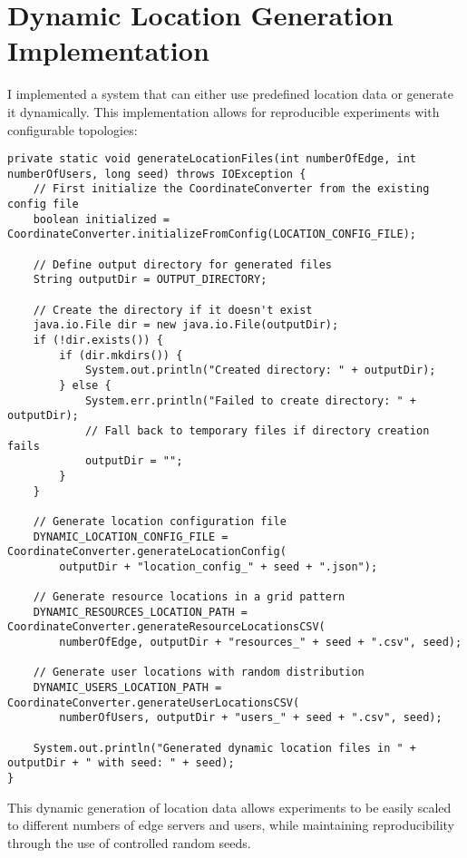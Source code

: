 \chapter{Dynamic Location Generation Implementation}
\label{appendix:location-generation}

I implemented a system that can either use predefined location data or generate it dynamically. This implementation allows for reproducible experiments with configurable topologies:

\begin{verbatim}
private static void generateLocationFiles(int numberOfEdge, int numberOfUsers, long seed) throws IOException {
    // First initialize the CoordinateConverter from the existing config file
    boolean initialized = CoordinateConverter.initializeFromConfig(LOCATION_CONFIG_FILE);
    
    // Define output directory for generated files
    String outputDir = OUTPUT_DIRECTORY;
    
    // Create the directory if it doesn't exist
    java.io.File dir = new java.io.File(outputDir);
    if (!dir.exists()) {
        if (dir.mkdirs()) {
            System.out.println("Created directory: " + outputDir);
        } else {
            System.err.println("Failed to create directory: " + outputDir);
            // Fall back to temporary files if directory creation fails
            outputDir = "";
        }
    }
    
    // Generate location configuration file
    DYNAMIC_LOCATION_CONFIG_FILE = CoordinateConverter.generateLocationConfig(
        outputDir + "location_config_" + seed + ".json");
    
    // Generate resource locations in a grid pattern
    DYNAMIC_RESOURCES_LOCATION_PATH = CoordinateConverter.generateResourceLocationsCSV(
        numberOfEdge, outputDir + "resources_" + seed + ".csv", seed);
    
    // Generate user locations with random distribution
    DYNAMIC_USERS_LOCATION_PATH = CoordinateConverter.generateUserLocationsCSV(
        numberOfUsers, outputDir + "users_" + seed + ".csv", seed);
    
    System.out.println("Generated dynamic location files in " + outputDir + " with seed: " + seed);
}
\end{verbatim}

This dynamic generation of location data allows experiments to be easily scaled to different numbers of edge servers and users, while maintaining reproducibility through the use of controlled random seeds. 